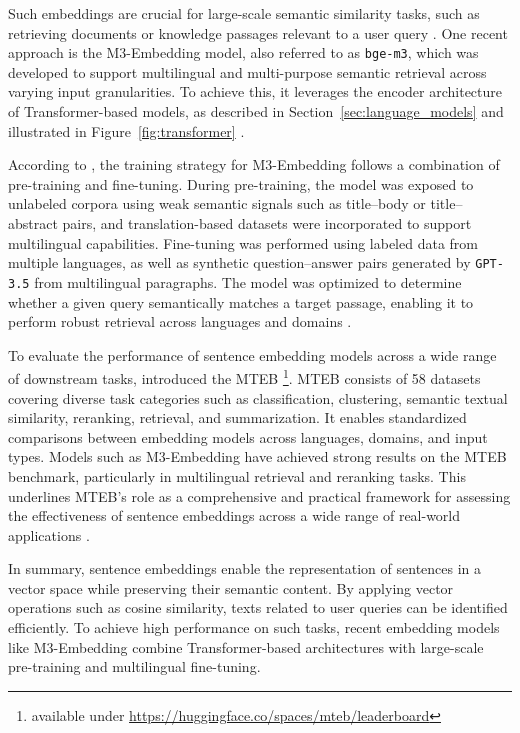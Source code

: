 \documentclass[a4paper,oneside,bibliography=totoc]{scrbook}
\begin{document}
Such embeddings are crucial for large-scale semantic similarity tasks, such as retrieving documents or knowledge passages relevant to a user query \cite{Reimers2019,Gao2024}. One recent approach is the M3-Embedding model, also referred to as \texttt{bge-m3}, which was developed to support multilingual and multi-purpose semantic retrieval across varying input granularities. To achieve this, it leverages the encoder architecture of Transformer-based models, as described in Section~\ref{sec:language_models} and illustrated in Figure~\ref{fig:transformer} \cite{Chen2024}.

According to \cite{Chen2024}, the training strategy for M3-Embedding follows a combination of pre-training and fine-tuning. During pre-training, the model was exposed to unlabeled corpora using weak semantic signals such as title–body or title–abstract pairs, and translation-based datasets were incorporated to support multilingual capabilities. Fine-tuning was performed using labeled data from multiple languages, as well as synthetic question–answer pairs generated by \texttt{GPT-3.5} from multilingual paragraphs. The model was optimized to determine whether a given query semantically matches a target passage, enabling it to perform robust retrieval across languages and domains \cite{Chen2024}.

To evaluate the performance of sentence embedding models across a wide range of downstream tasks, \citet{Muennighoff2023} introduced the \ac{MTEB} \footnote{available under \url{https://huggingface.co/spaces/mteb/leaderboard}}. \ac{MTEB} consists of 58 datasets covering diverse task categories such as classification, clustering, semantic textual similarity, reranking, retrieval, and summarization. It enables standardized comparisons between embedding models across languages, domains, and input types. Models such as M3-Embedding have achieved strong results on the \ac{MTEB} benchmark, particularly in multilingual retrieval and reranking tasks. This underlines \ac{MTEB}'s role as a comprehensive and practical framework for assessing the effectiveness of sentence embeddings across a wide range of real-world applications \cite{Muennighoff2023}.

In summary, sentence embeddings enable the representation of sentences in a vector space while preserving their semantic content. By applying vector operations such as cosine similarity, texts related to user queries can be identified efficiently. To achieve high performance on such tasks, recent embedding models like M3-Embedding combine Transformer-based architectures with large-scale pre-training and multilingual fine-tuning.
\end{document}
